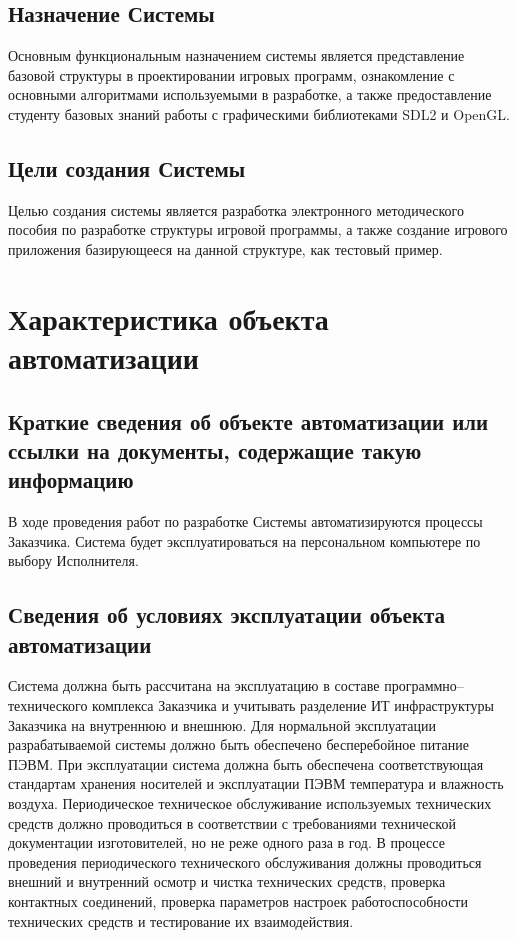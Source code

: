\section{Назначение Системы}
Основным функциональным назначением системы является представление базовой структуры в 
проектировании игровых программ, ознакомление с основными алгоритмами используемыми в разработке, 
а также предоставление студенту базовых знаний работы с графическими библиотеками SDL2 и OpenGL.

\section{Цели создания Системы}
Целью создания системы является разработка электронного методического пособия по разработке структуры
игровой программы, а также создание игрового приложения базирующееся на данной структуре, как тестовый 
пример.

\chapter{Характеристика объекта автоматизации}
\section{Краткие сведения об объекте автоматизации или ссылки на документы, содержащие такую 
    информацию}
В ходе проведения работ по разработке Системы автоматизируются процессы Заказчика. Система будет 
эксплуатироваться на персональном компьютере по выбору Исполнителя.

\section{Сведения об условиях эксплуатации объекта автоматизации} %
Система должна быть рассчитана на эксплуатацию в составе программно–технического комплекса Заказчика и 
учитывать разделение ИТ инфраструктуры Заказчика на внутреннюю и внешнюю. Для нормальной эксплуатации 
разрабатываемой системы должно быть обеспечено бесперебойное питание ПЭВМ. При эксплуатации система 
должна быть обеспечена соответствующая стандартам хранения носителей и эксплуатации ПЭВМ температура и 
влажность воздуха. Периодическое техническое обслуживание используемых технических средств должно 
проводиться в соответствии с требованиями технической документации изготовителей, но не реже одного 
раза в год. В процессе проведения периодического технического обслуживания должны проводиться внешний и 
внутренний осмотр и чистка технических средств, проверка контактных соединений, проверка параметров 
настроек работоспособности технических средств и тестирование их взаимодействия.


